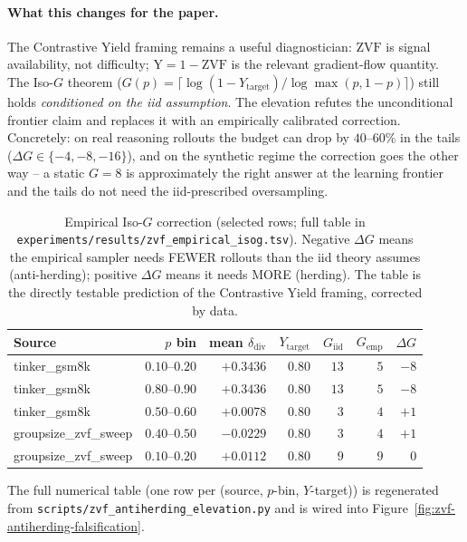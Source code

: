 \paragraph{What this changes for the paper.}
The Contrastive Yield framing remains a useful diagnostician:
$\mathrm{ZVF}$ is signal availability, not difficulty; $\mathrm{Y} =
1 - \mathrm{ZVF}$ is the relevant gradient-flow quantity. The Iso-$G$
theorem ($G(p) = \lceil \log(1 - Y_{\mathrm{target}}) / \log \max(p, 1 - p) \rceil$)
still holds \emph{conditioned on the iid assumption}. The elevation
refutes the unconditional frontier claim and replaces it with an
empirically calibrated correction. Concretely: on real reasoning
rollouts the budget can drop by $40\text{--}60\%$ in the tails
($\Delta G \in \{-4, -8, -16\}$), and on the synthetic regime the
correction goes the other way -- a static $G = 8$ is approximately
the right answer at the learning frontier and the tails do not need
the iid-prescribed oversampling.

\begin{table}[ht]
\centering
\small
\begin{tabular}{lrrrrrr}
\toprule
Source & $p$ bin & mean $\delta_{\mathrm{div}}$ & $Y_{\mathrm{target}}$ & $G_{\mathrm{iid}}$ & $G_{\mathrm{emp}}$ & $\Delta G$ \\
\midrule
tinker\_gsm8k          & $0.10$--$0.20$ & $+0.3436$ & $0.80$ & $13$ & $ 5$ & $-8$ \\
tinker\_gsm8k          & $0.80$--$0.90$ & $+0.3436$ & $0.80$ & $13$ & $ 5$ & $-8$ \\
tinker\_gsm8k          & $0.50$--$0.60$ & $+0.0078$ & $0.80$ & $ 3$ & $ 4$ & $+1$ \\
groupsize\_zvf\_sweep  & $0.40$--$0.50$ & $-0.0229$ & $0.80$ & $ 3$ & $ 4$ & $+1$ \\
groupsize\_zvf\_sweep  & $0.10$--$0.20$ & $+0.0112$ & $0.80$ & $ 9$ & $ 9$ & $ 0$ \\
\bottomrule
\end{tabular}
\caption{Empirical Iso-$G$ correction (selected rows; full table in
\texttt{experiments/results/zvf\_empirical\_isog.tsv}). Negative
$\Delta G$ means the empirical sampler needs FEWER rollouts than the
iid theory assumes (anti-herding); positive $\Delta G$ means it needs
MORE (herding). The table is the directly testable prediction of the
Contrastive Yield framing, corrected by data.
}
\label{tab:zvf-empirical-isog}
\end{table}

The full numerical table (one row per (source, $p$-bin, $Y$-target))
is regenerated from \texttt{scripts/zvf\_antiherding\_elevation.py}
and is wired into Figure~\ref{fig:zvf-antiherding-falsification}.


